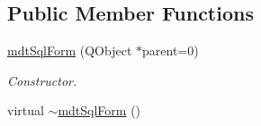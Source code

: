 \subsection*{Public Member Functions}
\begin{DoxyCompactItemize}
\item 
\hypertarget{classmdt_sql_form_aeaddb68cb5bb5035128377954d4721d3}{
\hyperlink{classmdt_sql_form_aeaddb68cb5bb5035128377954d4721d3}{mdtSqlForm} (QObject $\ast$parent=0)}
\label{classmdt_sql_form_aeaddb68cb5bb5035128377954d4721d3}

\begin{DoxyCompactList}\small\item\em Constructor. \end{DoxyCompactList}\item 
\hypertarget{classmdt_sql_form_ab4538979323566433a20bb71118525a5}{
virtual \hyperlink{classmdt_sql_form_ab4538979323566433a20bb71118525a5}{$\sim$mdtSqlForm} ()}
\label{classmdt_sql_form_ab4538979323566433a20bb71118525a5}


\end{DoxyCompactItemize}
